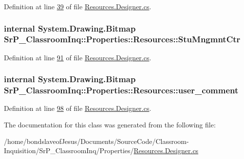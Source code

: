 \-Definition at line \hyperlink{_resources_8_designer_8cs_source_l00039}{39} of file \hyperlink{_resources_8_designer_8cs_source}{\-Resources.\-Designer.\-cs}.

\hypertarget{class_sr_p___classroom_inq_1_1_properties_1_1_resources_a8936df34fac714793207e165f0e1abb3}{
\subsubsection[{\-Stu\-Mngmnt\-Ctr}]{\setlength{\rightskip}{0pt plus 5cm}internal \-System.\-Drawing.\-Bitmap \-Sr\-P\-\_\-\-Classroom\-Inq\-::\-Properties\-::\-Resources\-::\-Stu\-Mngmnt\-Ctr}}
\label{class_sr_p___classroom_inq_1_1_properties_1_1_resources_a8936df34fac714793207e165f0e1abb3}


\-Definition at line \hyperlink{_resources_8_designer_8cs_source_l00091}{91} of file \hyperlink{_resources_8_designer_8cs_source}{\-Resources.\-Designer.\-cs}.

\hypertarget{class_sr_p___classroom_inq_1_1_properties_1_1_resources_a640888878348ec44e2974837abb13f97}{
\subsubsection[{user\-\_\-comment}]{\setlength{\rightskip}{0pt plus 5cm}internal \-System.\-Drawing.\-Bitmap \-Sr\-P\-\_\-\-Classroom\-Inq\-::\-Properties\-::\-Resources\-::user\-\_\-comment}}
\label{class_sr_p___classroom_inq_1_1_properties_1_1_resources_a640888878348ec44e2974837abb13f97}


\-Definition at line \hyperlink{_resources_8_designer_8cs_source_l00098}{98} of file \hyperlink{_resources_8_designer_8cs_source}{\-Resources.\-Designer.\-cs}.



\-The documentation for this class was generated from the following file\-:\begin{DoxyCompactItemize}
\item 
/home/bondslaveof\-Jesus/\-Documents/\-Source\-Code/\-Classroom-\/\-Inquisition/\-Sr\-P\-\_\-\-Classroom\-Inq/\-Properties/\hyperlink{_resources_8_designer_8cs}{\-Resources.\-Designer.\-cs}\end{DoxyCompactItemize}
